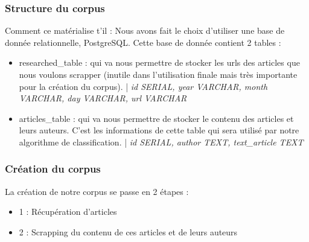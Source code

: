 \documentclass[french,12pt]{article}
\begin{document}
\subsubsection{Structure du corpus}

Comment ce matérialise t'il : Nous avons fait le choix d'utiliser une base de donnée relationnelle, PostgreSQL. Cette base de donnée contient 2 tables :\\

\begin{itemize}
    \item researched\_table : qui va nous permettre de stocker les urls des articles que nous voulons scrapper (inutile dans l'utilisation finale mais très importante pour la création du corpus). | \textit{id SERIAL, year VARCHAR, month VARCHAR, day VARCHAR, url VARCHAR}

    \item articles\_table : qui va nous permettre de stocker le contenu des articles et leurs auteurs. C'est les informations de cette table qui sera utilisé par notre algorithme de classification. | \textit{id SERIAL, author TEXT, text\_article TEXT}
\end{itemize}

\subsubsection{Création du corpus}

La création de notre corpus se passe en 2 étapes : \\
\begin{itemize}
    \item 1 : Récupération d'articles
    \item 2 : Scrapping du contenu de ces articles et de leurs auteurs\\
\end{itemize}
\end{document}
